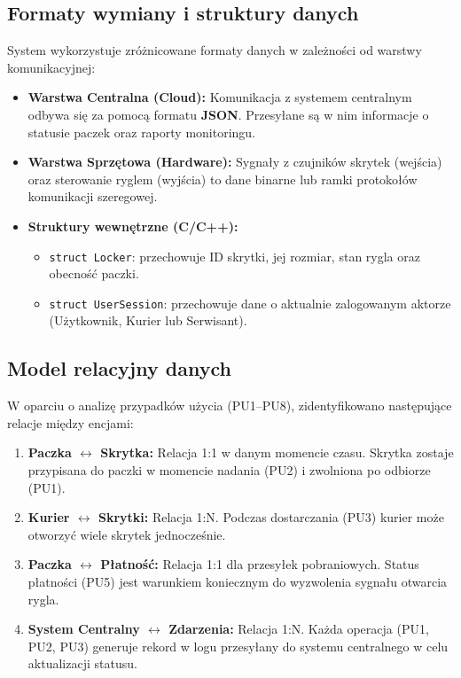 \documentclass[a4paper,12pt]{article}
\begin{document}
\subsection{Formaty wymiany i struktury danych}
System wykorzystuje zróżnicowane formaty danych w zależności od warstwy komunikacyjnej:

\begin{itemize}
    \item \textbf{Warstwa Centralna (Cloud):} Komunikacja z systemem centralnym odbywa się za pomocą formatu \textbf{JSON}. Przesyłane są w nim informacje o statusie paczek oraz raporty monitoringu.
    \item \textbf{Warstwa Sprzętowa (Hardware):} Sygnały z czujników skrytek (wejścia) oraz sterowanie ryglem (wyjścia) to dane binarne lub ramki protokołów komunikacji szeregowej.
    \item \textbf{Struktury wewnętrzne (C/C++):}
    \begin{itemize}
        \item \texttt{struct Locker}: przechowuje ID skrytki, jej rozmiar, stan rygla oraz obecność paczki.
        \item \texttt{struct UserSession}: przechowuje dane o aktualnie zalogowanym aktorze (Użytkownik, Kurier lub Serwisant).
    \end{itemize}
\end{itemize}

\subsection{Model relacyjny danych}
W oparciu o analizę przypadków użycia (PU1–PU8), zidentyfikowano następujące relacje między encjami:

\begin{enumerate}
    \item \textbf{Paczka $\leftrightarrow$ Skrytka:} Relacja 1:1 w danym momencie czasu. Skrytka zostaje przypisana do paczki w momencie nadania (PU2) i zwolniona po odbiorze (PU1).
    \item \textbf{Kurier $\leftrightarrow$ Skrytki:} Relacja 1:N. Podczas dostarczania (PU3) kurier może otworzyć wiele skrytek jednocześnie.
    \item \textbf{Paczka $\leftrightarrow$ Płatność:} Relacja 1:1 dla przesyłek pobraniowych. Status płatności (PU5) jest warunkiem koniecznym do wyzwolenia sygnału otwarcia rygla.
    \item \textbf{System Centralny $\leftrightarrow$ Zdarzenia:} Relacja 1:N. Każda operacja (PU1, PU2, PU3) generuje rekord w logu przesyłany do systemu centralnego w celu aktualizacji statusu.
\end{enumerate}
\end{document}
